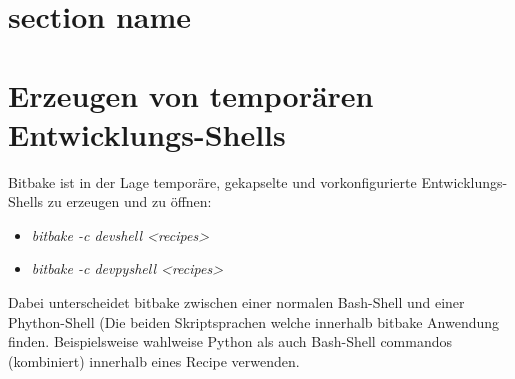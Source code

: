 \section{section name}%
\label{sec:section_name}


\section{Erzeugen von temporären Entwicklungs-Shells}%
\label{sec:temporaten_entwicklungs_shells}

Bitbake ist in der Lage temporäre, gekapselte und vorkonfigurierte
Entwicklungs-Shells zu erzeugen und zu öffnen:

\begin{itemize}
    \item \textit{bitbake -c devshell <recipes>}
    \item \textit{bitbake -c devpyshell <recipes>}
\end{itemize}

Dabei unterscheidet bitbake zwischen einer normalen Bash-Shell und einer
Phython-Shell (Die beiden Skriptsprachen welche innerhalb bitbake Anwendung
finden. Beispielsweise wahlweise Python als auch Bash-Shell commandos
(kombiniert) innerhalb eines Recipe verwenden.



